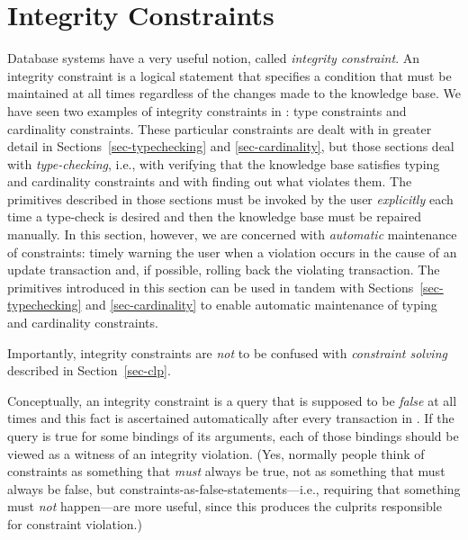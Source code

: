 
\section{Integrity Constraints}
\label{sec-kb-constraints}

Database systems have a very useful notion, called \emph{integrity constraint}. 
An integrity constraint is a logical statement that specifies a condition
that must be maintained at all times regardless of the changes made to the
knowledge base. We have seen two examples of integrity constraints in
\FLSYSTEM: type constraints and cardinality constraints. These particular
constraints are dealt with in greater detail in
Sections~\ref{sec-typechecking} and \ref{sec-cardinality}, but those
sections deal with
\emph{type-checking}, i.e., with verifying that the knowledge base
satisfies  typing and cardinality constraints and with finding out what violates
them. The primitives described in those sections must be invoked by
the user \emph{explicitly} each time a type-check is desired and then the
knowledge base must be repaired manually.
In this section, however, we are concerned with \emph{automatic} maintenance of
constraints: timely warning the user when a violation occurs in the cause of an
update transaction and, if possible, rolling back the violating
transaction. The primitives introduced in this section can be used in
tandem with Sections~\ref{sec-typechecking} and \ref{sec-cardinality}
to enable automatic maintenance of typing and cardinality constraints.

Importantly, integrity constraints are \emph{not} to be confused with
\emph{constraint solving} described in Section~\ref{sec-clp}.

Conceptually, an integrity constraint is a query that is supposed
to be \emph{false} at all times and this fact is ascertained automatically
after every transaction in \ERGO. If the query is true for some bindings of its
arguments, each of those bindings should be viewed as  a witness of an
integrity violation.
(Yes, normally people think of constraints as something that \emph{must}
always be true, not as something that must always be false, but
constraints-as-false-statements---i.e., requiring that something must \emph{not}
happen---are more useful, since this produces the culprits
responsible for constraint violation.)

